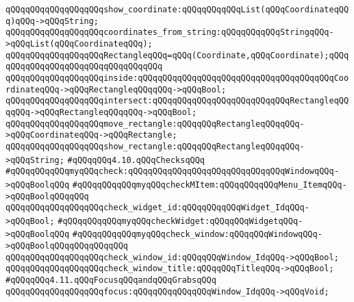 \verb|qQQqqQQqqQQqqQQqqQQqshow_coordinate:qQQqqQQqqQQqList(qQQqCoordinateqQQq)qQQq->qQQqString;|\newline
\verb|qQQqqQQqqQQqqQQqqQQqcoordinates_from_string:qQQqqQQqqQQqStringqQQq->qQQqList(qQQqCoordinateqQQq);|\newline
\newline
\newline
\verb|qQQqqQQqqQQqqQQqqQQqRectangleqQQq=qQQq(Coordinate,qQQqCoordinate);qQQq|\newline
\verb|qQQqqQQqqQQqqQQqqQQqqQQqqQQqqQQq|\newline
\verb|qQQqqQQqqQQqqQQqqQQqinside:qQQqqQQqqQQqqQQqqQQqqQQqqQQqqQQqqQQqqQQqCoordinateqQQq->qQQqRectangleqQQqqQQq->qQQqBool;|\newline
\verb|qQQqqQQqqQQqqQQqqQQqintersect:qQQqqQQqqQQqqQQqqQQqqQQqqQQqRectangleqQQqqQQq->qQQqRectangleqQQqqQQq->qQQqBool;|\newline
\verb|qQQqqQQqqQQqqQQqqQQqmove_rectangle:qQQqqQQqRectangleqQQqqQQq->qQQqCoordinateqQQq->qQQqRectangle;|\newline
\verb|qQQqqQQqqQQqqQQqqQQqshow_rectangle:qQQqqQQqRectangleqQQqqQQq->qQQqString;|\newline
\newline
\verb|#qQQqqQQq4.10.qQQqChecksqQQq|\newline
\newline
\verb|#qQQqqQQqqQQqmyqQQqcheck:qQQqqQQqqQQqqQQqqQQqqQQqqQQqqQQqWindowqQQq->qQQqBoolqQQq|\newline
\verb|#qQQqqQQqqQQqmyqQQqcheckMItem:qQQqqQQqqQQqMenu_ItemqQQq->qQQqBoolqQQqqQQq|\newline
\verb|qQQqqQQqqQQqqQQqqQQqcheck_widget_id:qQQqqQQqqQQqWidget_IdqQQq->qQQqBool;|\newline
\verb|#qQQqqQQqqQQqmyqQQqcheckWidget:qQQqqQQqWidgetqQQq->qQQqBoolqQQq|\newline
\newline
\verb|#qQQqqQQqqQQqmyqQQqcheck_window:qQQqqQQqWindowqQQq->qQQqBoolqQQqqQQqqQQqqQQq|\newline
\verb|qQQqqQQqqQQqqQQqqQQqcheck_window_id:qQQqqQQqWindow_IdqQQq->qQQqBool;|\newline
\verb|qQQqqQQqqQQqqQQqqQQqcheck_window_title:qQQqqQQqTitleqQQq->qQQqBool;|\newline
\newline
\verb|#qQQqqQQq4.11.qQQqFocusqQQqandqQQqGrabsqQQq|\newline
\newline
\verb|qQQqqQQqqQQqqQQqqQQqfocus:qQQqqQQqqQQqqQQqWindow_IdqQQq->qQQqVoid;|\newline

